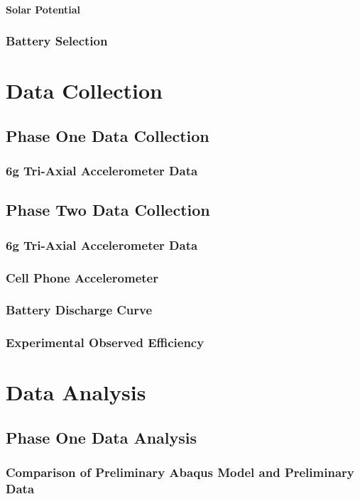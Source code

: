 \documentclass[12pt]{report}
\begin{document}
			\subsubsection{Solar Potential}
		\subsection{Battery Selection}
		
\chapter{Data Collection}
	\section{Phase One Data Collection}
		\subsection{6g Tri-Axial Accelerometer Data}
	\section{Phase Two Data Collection}
		\subsection{6g Tri-Axial Accelerometer Data}
		\subsection{Cell Phone Accelerometer}
		\subsection{Battery Discharge Curve}
		\subsection{Experimental Observed Efficiency}
\chapter{Data Analysis}
	\section{Phase One Data Analysis}
		\subsection{Comparison of Preliminary Abaqus Model and Preliminary Data}
\end{document}

